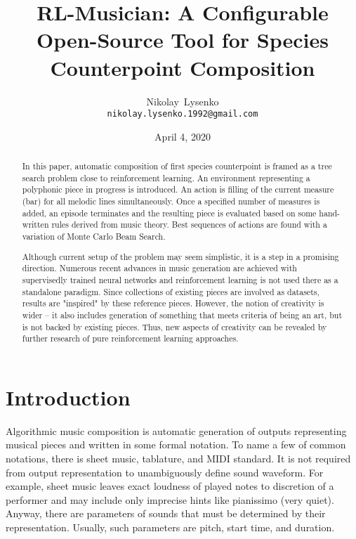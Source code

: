 \documentclass{article}
\title{RL-Musician: A Configurable Open-Source Tool for Species Counterpoint Composition}
\date{April 4, 2020}
\author{
  Nikolay~Lysenko\\
  \texttt{nikolay.lysenko.1992@gmail.com} \\
}
\begin{document}
\maketitle

\begin{abstract}
In this paper, automatic composition of first species counterpoint is framed as a tree search problem close to reinforcement learning. An environment representing a polyphonic piece in progress is introduced. An action is filling of the current measure (bar) for all melodic lines simultaneously. Once a specified number of measures is added, an episode terminates and the resulting piece is evaluated based on some hand-written rules derived from music theory. Best sequences of actions are found with a variation of Monte Carlo Beam Search.

Although current setup of the problem may seem simplistic, it is a step in a promising direction. Numerous recent advances in music generation are achieved with supervisedly trained neural networks and reinforcement learning is not used there as a standalone paradigm. Since collections of existing pieces are involved as datasets, results are "inspired" by these reference pieces. However, the notion of creativity is wider -- it also includes generation of something that meets criteria of being an art, but is not backed by existing pieces. Thus, new aspects of creativity can be revealed by further research of pure reinforcement learning approaches.
\end{abstract}



\section{Introduction}
\label{sec:introduction}

Algorithmic music composition is automatic generation of outputs representing musical pieces and written in some formal notation. To name a few of common notations, there is sheet music, tablature, and MIDI standard. It is not required from output representation to unambiguously define sound waveform. For example, sheet music leaves exact loudness of played notes to discretion of a performer and may include only imprecise hints like pianissimo (very quiet). Anyway, there are parameters of sounds that must be determined by their representation. Usually, such parameters are pitch, start time, and duration.
\end{document}
